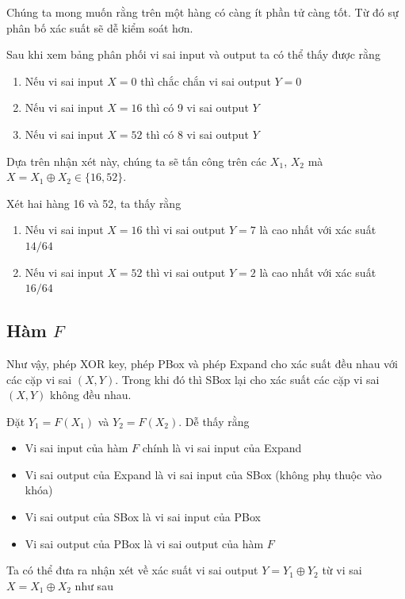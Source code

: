 \documentclass{article}
\begin{document}
Chúng ta mong muốn rằng trên một hàng có càng ít phần tử càng tốt. 
Từ đó sự phân bố xác suất sẽ dễ kiểm soát hơn.

Sau khi xem bảng phân phối vi sai input và output ta có thể thấy được rằng

\begin{enumerate}
    \item Nếu vi sai input $X = 0$ thì chắc chắn vi sai output $Y = 0$
    \item Nếu vi sai input $X = 16$ thì có 9 vi sai output $Y$
    \item Nếu vi sai input $X = 52$ thì có 8 vi sai output $Y$
\end{enumerate}

Dựa trên nhận xét này, chúng ta sẽ tấn công trên các $X_1$, $X_2$ mà 
$X = X_1 \oplus X_2 \in \{ 16, 52 \}$.

Xét hai hàng 16 và 52, ta thấy rằng

\begin{enumerate}
    \item Nếu vi sai input $X = 16$ thì vi sai output $Y = 7$ là cao nhất với
    xác suất $14/64$
    \item Nếu vi sai input $X = 52$ thì vi sai output $Y = 2$ là cao nhất với
    xác suất $16/64$
\end{enumerate}

\subsection{Hàm $F$}

Như vậy, phép XOR key, phép PBox và phép Expand cho xác suất đều nhau với các
cặp vi sai $(X, Y)$. Trong khi đó thì SBox lại cho xác suất các cặp vi sai $(X, Y)$
không đều nhau. 

Đặt $Y_1 = F(X_1)$ và $Y_2 = F(X_2)$. Dễ thấy rằng

\begin{itemize}
    \item Vi sai input của hàm $F$ chính là vi sai input của Expand
    \item Vi sai output của Expand là vi sai input của SBox (không phụ thuộc vào khóa)
    \item Vi sai output của SBox là vi sai input của PBox
    \item Vi sai output của PBox là vi sai output của hàm $F$
\end{itemize}

Ta có thể đưa ra nhận xét về xác suất 
vi sai output $Y = Y_1 \oplus Y_2$ từ vi sai $X = X_1 \oplus X_2$ như sau
\end{document}
